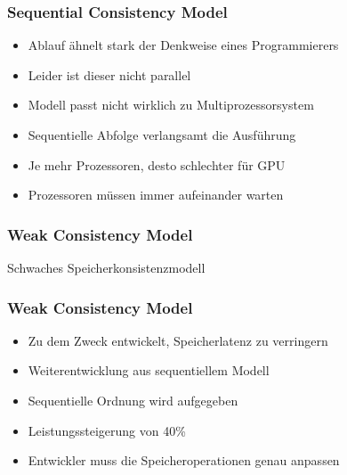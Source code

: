 \documentclass{sikslides}
\begin{document}
\begin{frame}
	\frametitle{Sequential Consistency Model}
	
	\begin{itemize}
		\item Ablauf ähnelt stark der Denkweise eines Programmierers\bigskip
		\item Leider ist dieser nicht parallel\bigskip
		\item Modell passt nicht wirklich zu Multiprozessorsystem\bigskip
		\item Sequentielle Abfolge verlangsamt die Ausführung\bigskip
		\item Je mehr Prozessoren, desto schlechter für GPU\bigskip
		\item Prozessoren müssen immer aufeinander warten
	\end{itemize}
\bigskip
\end{frame}



\begin{frame}
	\frametitle{Weak Consistency Model}
Schwaches Speicherkonsistenzmodell
\end{frame}


\begin{frame}
	\frametitle{Weak Consistency Model}
	\begin{itemize}
		\item Zu dem Zweck entwickelt, Speicherlatenz zu verringern \bigskip
		\item Weiterentwicklung aus sequentiellem Modell \bigskip
		\item Sequentielle Ordnung wird aufgegeben \bigskip
		\item Leistungssteigerung von 40\% \bigskip
		\item Entwickler muss die Speicheroperationen genau anpassen
	\end{itemize}
\end{frame}
\end{document}
